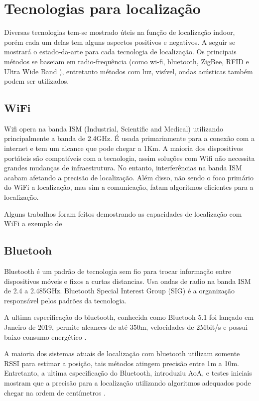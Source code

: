 \section{Tecnologias para localização}
Diversas tecnologias tem-se mostrado úteis na função de localização indoor, porém cada um delas tem alguns aspectos positivos e negativos. A seguir se mostrará o estado-da-arte para cada tecnologia de localização. Os principais métodos se baseiam em radio-frequência (como wi-fi, bluetooth, ZigBee, RFID e Ultra Wide Band ), entretanto métodos com luz, visível, ondas acústicas também podem ser utilizados.

\subsection{WiFi}
Wifi opera na banda ISM (Industrial, Scientific and Medical) utilizando principalmente a banda de 2.4GHz. É usada primariamente para a conexão com a internet e tem um alcance que pode chegar a 1Km. A maioria dos dispositivos portáteis são compatíveis com a tecnologia, assim soluções com Wifi não necessita grandes mudanças de infraestrutura. No entanto, interferências na banda ISM acabam afetando a precisão de localização. Além disso, não sendo o foco primário do WiFi a localização, mas sim a comunicação, fatam algoritmos eficientes para a localização.

Alguns trabalhos foram feitos demostrando as capacidades de localização com WiFi a exemplo de \cite{art7}

\subsection{Bluetooh}
Bluetooth é um padrão de tecnologia sem fio para trocar informação entre dispositivos móveis e fixos a curtas distancias. Usa ondas de radio na banda ISM de 2.4 a 2.485GHz. Bluetooth Special Interest Group (SIG) é a organização responsável pelos padrões da tecnologia.

A ultima especificação do bluetooth, conhecida como Bluetooh 5.1 foi lançado em Janeiro de 2019, permite alcances de até 350m, velocidades de 2Mbit/s e possui baixo consumo energético \cite{art8}.

A maioria dos sistemas atuais de localização com bluetooth utilizam somente RSSI para estimar a posição, tais métodos atingem precisão entre 1m a 10m. Entretanto, a ultima especificação do Bluetooth, introduziu AoA, e testes iniciais mostram que a precisão para a localização utilizando algoritmos adequados pode chegar na ordem de centímetros \cite{art9}.

